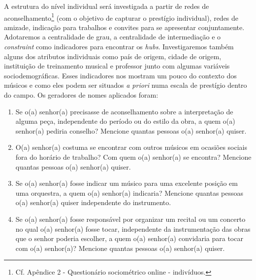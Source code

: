 \documentclass[a4paper, 12pt, openright, oneside, german, french, english, brazil]{abntex2}
\begin{document}
	A estrutura do nível individual será investigada a partir de redes de aconselhamento\footnote{Cf. Apêndice 2 - Questionário sociométrico online - indivíduos.} (com o objetivo de capturar o prestígio individual), redes de amizade, indicação para trabalhos e convites para se apresentar conjuntamente. Adotaremos a centralidade de grau, a centralidade de intermediação e o \textit{constraint} como indicadores para encontrar os \textit{hubs}. Investigaremos também alguns dos atributos individuais como país de origem, cidade de origem, instituição de treinamento musical e professor junto com algumas variáveis sociodemográficas. Esses indicadores nos mostram um pouco do contexto dos músicos e como eles podem ser situados \textit{a priori} numa escala de prestígio dentro do campo. Os geradores de nomes aplicados foram:
	
	\begin{enumerate}
		\item Se o(a) senhor(a) precisasse de aconselhamento sobre a interpretação de alguma peça, independente do período ou do estilo da obra, a quem o(a) senhor(a) pediria conselho? Mencione quantas pessoas o(a) senhor(a) quiser.
		\item O(a) senhor(a) costuma se encontrar com outros músicos em ocasiões sociais fora do horário de trabalho? Com quem o(a) senhor(a) se encontra? Mencione quantas pessoas o(a) senhor(a) quiser.
		\item Se o(a) senhor(a) fosse indicar um músico para uma excelente posição em uma orquestra, a quem o(a) senhor(a) indicaria? Mencione quantas pessoas o(a) senhor(a) quiser independente do instrumento.
		\item Se o(a) senhor(a) fosse responsável por organizar um recital ou um concerto no qual o(a) senhor(a) fosse tocar, independente da instrumentação das obras que o senhor poderia escolher, a quem o(a) senhor(a) convidaria para tocar com o(a) senhor(a)? Mencione quantas pessoas o(a) senhor(a) quiser.
	\end{enumerate}




	
	
	
\end{document}
